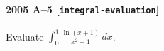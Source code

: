 \paragraph{2005 A--5 \textnormal{[\texttt{integral-evaluation}]}}
Evaluate $\int_0^1 \frac{\ln(x+1)}{x^2+1}\,dx$.
